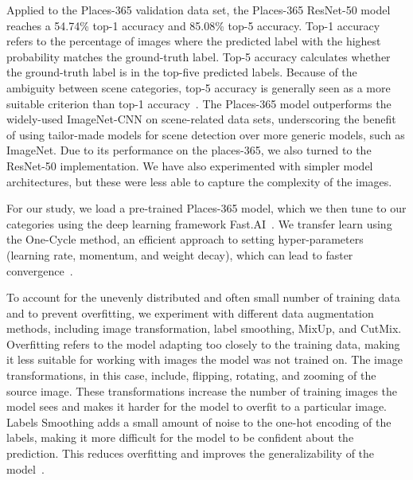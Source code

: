 \documentclass[a4paper,twoside]{article}
\begin{document}
Applied to the Places-365 validation data set, the Places-365 ResNet-50 model reaches a 54.74\% top-1 accuracy and 85.08\% top-5 accuracy.
Top-1 accuracy refers to the percentage of images where the predicted label with the highest probability matches the ground-truth label.
Top-5 accuracy calculates whether the ground-truth label is in the top-five predicted labels. 
Because of the ambiguity between scene categories, top-5 accuracy is generally seen as a more suitable criterion than top-1 accuracy~\cite{zhou_places_2018}. 
The Places-365 model outperforms the widely-used ImageNet-CNN on scene-related data sets, underscoring the benefit of using tailor-made models for scene detection over more generic models, such as ImageNet. Due to its performance on the places-365, we also turned to the ResNet-50 implementation. We have also experimented with simpler model architectures, but these were less able to capture the complexity of the images. 

For our study, we load a pre-trained Places-365 model, which we then tune to our categories using the deep learning framework Fast.AI~\cite{howard2018fastai}. 
We transfer learn using the One-Cycle method, an efficient approach to setting hyper-parameters (learning rate, momentum, and weight decay), which can lead to faster convergence~\cite{smithDisciplinedApproachNeural2018a}. 

To account for the unevenly distributed and often small number of training data and to prevent overfitting, we experiment with different data augmentation methods, including image transformation, label smoothing, MixUp, and CutMix. 
Overfitting refers to the model adapting too closely to the training data, making it less suitable for working with images the model was not trained on. 
The image transformations, in this case, include, flipping, rotating, and zooming of the source image. 
These transformations increase the number of training images the model sees and makes it harder for the model to overfit to a particular image. 
Labels Smoothing adds a small amount of noise to the one-hot encoding of the labels, making it more difficult for the model to be confident about the prediction. 
This reduces overfitting and improves the generalizability of the model~\cite{szegedyGoingDeeperConvolutions2014}.
\end{document}
